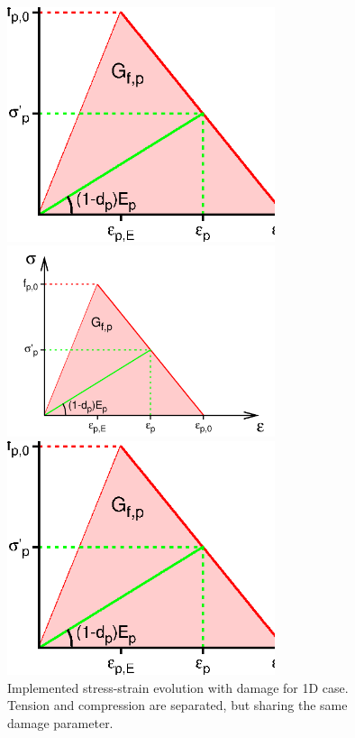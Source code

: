 \documentclass[a4paper]{article}
\begin{document}
\begin{figure}[!htb]
\begin{htmlonly}
  \centerline{\includegraphics[width=0.7\textwidth]{Compodamagemat_diag.eps}}
\end{htmlonly}
\ifpdf
 \centerline{\includegraphics[width=0.7\textwidth]{Compodamagemat_diag.pdf}}
\else
 \centerline{\includegraphics[width=0.7\textwidth]{Compodamagemat_diag.eps}}
\fi
  \caption{Implemented stress-strain evolution with damage for 1D case. Tension and compression are separated, but sharing the same damage parameter.}
  \label{comp_softening}
\end{figure}
\end{document}
